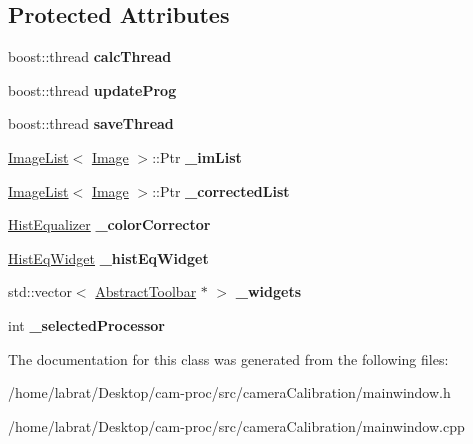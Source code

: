 \subsection*{Protected Attributes}
\begin{DoxyCompactItemize}
\item 
boost\+::thread {\bfseries calc\+Thread}\hypertarget{classMainWindow_adc1fa10e43820fcd4579f3ddfbde6243}{}\label{classMainWindow_adc1fa10e43820fcd4579f3ddfbde6243}

\item 
boost\+::thread {\bfseries update\+Prog}\hypertarget{classMainWindow_a766dac64a7d67b83e098a2b66623773a}{}\label{classMainWindow_a766dac64a7d67b83e098a2b66623773a}

\item 
boost\+::thread {\bfseries save\+Thread}\hypertarget{classMainWindow_ab5839043c7dd669d2e4a97b1e8cb5b21}{}\label{classMainWindow_ab5839043c7dd669d2e4a97b1e8cb5b21}

\item 
\hyperlink{classImageList}{Image\+List}$<$ \hyperlink{classImage}{Image} $>$\+::Ptr {\bfseries \+\_\+im\+List}\hypertarget{classMainWindow_a3e0701c021c78ddd038d4ba20a3c1c3e}{}\label{classMainWindow_a3e0701c021c78ddd038d4ba20a3c1c3e}

\item 
\hyperlink{classImageList}{Image\+List}$<$ \hyperlink{classImage}{Image} $>$\+::Ptr {\bfseries \+\_\+corrected\+List}\hypertarget{classMainWindow_aec6cbd9577a214b0f5da368e5202a5fd}{}\label{classMainWindow_aec6cbd9577a214b0f5da368e5202a5fd}

\item 
\hyperlink{classHistEqualizer}{Hist\+Equalizer} {\bfseries \+\_\+color\+Corrector}\hypertarget{classMainWindow_acaa184eb1afcde34cf2261ff7543789d}{}\label{classMainWindow_acaa184eb1afcde34cf2261ff7543789d}

\item 
\hyperlink{classHistEqWidget}{Hist\+Eq\+Widget} {\bfseries \+\_\+hist\+Eq\+Widget}\hypertarget{classMainWindow_a7fd1fcd285f6022dcd3e2b8edf2b9546}{}\label{classMainWindow_a7fd1fcd285f6022dcd3e2b8edf2b9546}

\item 
std\+::vector$<$ \hyperlink{classAbstractToolbar}{Abstract\+Toolbar} $\ast$ $>$ {\bfseries \+\_\+widgets}\hypertarget{classMainWindow_a3e3be31da9bff548ad7ce576f68cfe44}{}\label{classMainWindow_a3e3be31da9bff548ad7ce576f68cfe44}

\item 
int {\bfseries \+\_\+selected\+Processor}\hypertarget{classMainWindow_ad327c5d0e4c369c783a26dcb619d71b7}{}\label{classMainWindow_ad327c5d0e4c369c783a26dcb619d71b7}

\end{DoxyCompactItemize}


The documentation for this class was generated from the following files\+:\begin{DoxyCompactItemize}
\item 
/home/labrat/\+Desktop/cam-\/proc/src/camera\+Calibration/mainwindow.\+h\item 
/home/labrat/\+Desktop/cam-\/proc/src/camera\+Calibration/mainwindow.\+cpp\end{DoxyCompactItemize}
